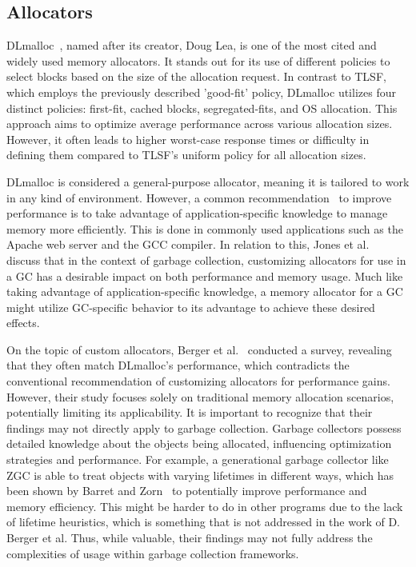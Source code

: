 
\subsection{Allocators}

DLmalloc~\cite{dlmalloc}, named after its creator, Doug Lea, is one of the most cited and widely used memory allocators. It stands out for its use of different policies to select blocks based on the size of the allocation request. In contrast to TLSF, which employs the previously described 'good-fit' policy, DLmalloc utilizes four distinct policies: first-fit, cached blocks, segregated-fits, and OS allocation. This approach aims to optimize average performance across various allocation sizes. However, it often leads to higher worst-case response times or difficulty in defining them compared to TLSF's uniform policy for all allocation sizes.

DLmalloc is considered a general-purpose allocator, meaning it is tailored to work in any kind of environment. However, a common recommendation~\cite{custom_rec_1, custom_rec_2} to improve performance is to take advantage of application-specific knowledge to manage memory more efficiently. This is done in commonly used applications such as the Apache web server and the GCC compiler. In relation to this, Jones et al.~\cite{gchandbook} discuss that in the context of garbage collection, customizing allocators for use in a GC has a desirable impact on both performance and memory usage. Much like taking advantage of application-specific knowledge, a memory allocator for a GC might utilize GC-specific behavior to its advantage to achieve these desired effects.

On the topic of custom allocators, Berger et al.~\cite{slow_custom_allocators} conducted a survey, revealing that they often match DLmalloc's performance, which contradicts the conventional recommendation of customizing allocators for performance gains. However, their study focuses solely on traditional memory allocation scenarios, potentially limiting its applicability. It is important to recognize that their findings may not directly apply to garbage collection. Garbage collectors possess detailed knowledge about the objects being allocated, influencing optimization strategies and performance. For example, a generational garbage collector like ZGC is able to treat objects with varying lifetimes in different ways, which has been shown by Barret and Zorn~\cite{lifetime_predictors_memalloc} to potentially improve performance and memory efficiency. This might be harder to do in other programs due to the lack of lifetime heuristics, which is something that is not addressed in the work of D. Berger et al. Thus, while valuable, their findings may not fully address the complexities of usage within garbage collection frameworks.

